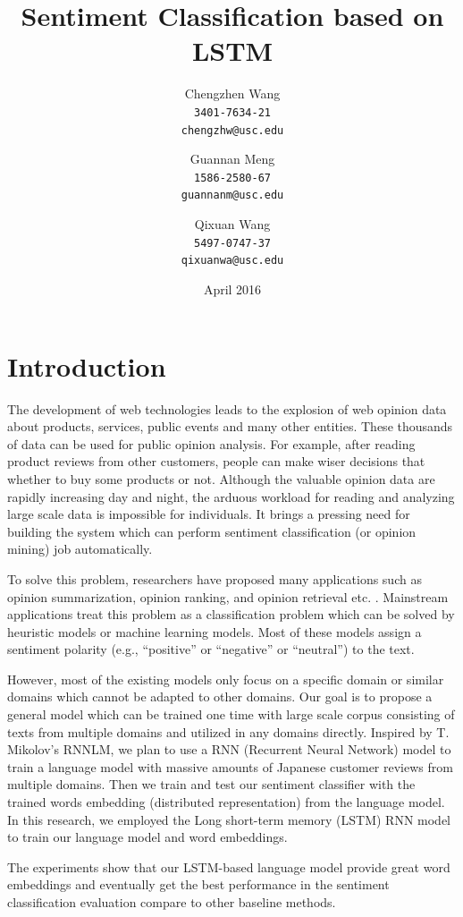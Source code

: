 \documentclass{article}
\title{Sentiment Classification based on LSTM}
\author{
  Chengzhen Wang\\
  \texttt{3401-7634-21}\\
  \texttt{chengzhw@usc.edu}
  \and
  Guannan Meng\\
  \texttt{1586-2580-67}\\
  \texttt{guannanm@usc.edu}
  \and
  Qixuan Wang\\
  \texttt{5497-0747-37}\\
  \texttt{qixuanwa@usc.edu}
}
\date{April 2016}
\begin{document}
\maketitle

\section{Introduction}
The development of web technologies leads to the explosion of web opinion data about products, services, public events and many other entities. These thousands of data can be used for public opinion analysis. For example, after reading product reviews from other customers, people can make wiser decisions that whether to buy some products or not. Although the valuable opinion data are rapidly increasing day and night, the arduous workload for reading and analyzing large scale data is impossible for individuals. It brings a pressing need for building the system which can perform sentiment classification (or opinion mining) job automatically.


To solve this problem, researchers have proposed many applications such as opinion summarization, opinion ranking, and opinion retrieval etc. \cite{liu2012sentiment}\cite{pang2008opinion}. Mainstream applications treat this problem as a classification problem which can be solved by heuristic models or machine learning models. Most of these models assign a sentiment polarity (e.g., “positive” or “negative” or “neutral”) to the text.


However, most of the existing models only focus on a specific domain or similar domains which cannot be adapted to other domains. Our goal is to propose a general model which can be trained one time with large scale corpus consisting of texts from multiple domains and utilized in any domains directly. Inspired by T. Mikolov's RNNLM\cite{mikolov2011rnnlm}, we plan to use a RNN (Recurrent Neural Network) model to train a language model with massive amounts of Japanese customer reviews from multiple domains. Then we train and test our sentiment classifier with the trained words embedding (distributed representation) from the language model. In this research, we employed the Long short-term memory (LSTM) RNN model \cite{hochreiter1997long}\cite{graves2012supervised} to train our language model and word embeddings.

The experiments show that our LSTM-based language model provide great word embeddings and eventually get the best performance in the sentiment classification evaluation compare to other baseline methods.
\end{document}
